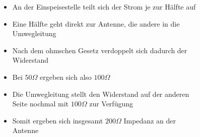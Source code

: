 \begin{frame}
\begin{columns}
\begin{figure}
    \end{figure}
    \begin{itemize}
      \item An der Einspeisestelle teilt sich der Strom je zur Hälfte auf
      \item Eine Hälfte geht direkt zur Antenne, die andere in die Umwegleitung
      \item Nach dem ohmschen Gesetz verdoppelt sich dadurch der Widerstand
      \item Bei $50 \Omega$ ergeben sich also $100 \Omega$
      \item Die Umwegleitung stellt den Widerstand auf der anderen Seite nochmal mit $100 \Omega$ zur Verfügung
      \item Somit ergeben sich insgesamt $200 \Omega$ Impedanz an der Antenne
    \end{itemize}
  \end{columns}
\end{frame}

